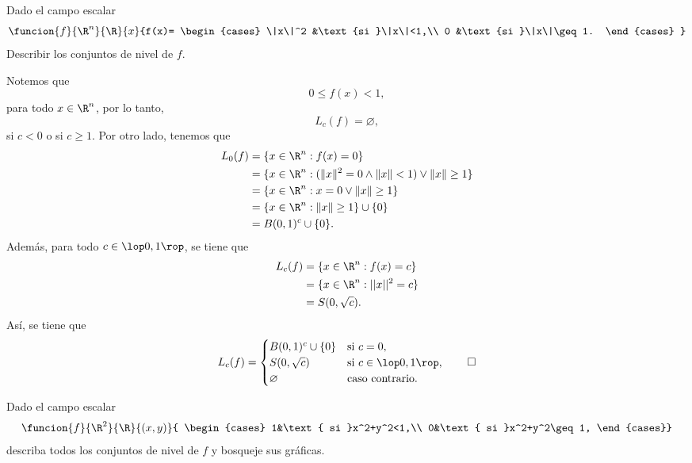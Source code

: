 \documentclass[a4,11pt]{aleph-examen}
\begin{document}
\encabezado

\begin{preguntas}

\item
    Dado el campo escalar
    \[
       \funcion{f}{\R^n}{\R}{x}
       {f(x)=
           \begin{cases}
               \|x\|^2 &\text{si }\|x\|<1,\\
               0 &\text{si }\|x\|\geq 1.
           \end{cases}
       }
    \]
    Describir los conjuntos de nivel de $f$.

\begin{respuesta}
    Notemos que
    \[
        0\leq f(x) < 1,
    \]
    para todo $x\in\R^n$, por lo tanto,
    \[
        L_c(f)=\varnothing,
    \]
    si $c<0$ o si $c\geq 1$. Por otro lado, tenemos que
    \begin{align*}
        L_0(f) 
            &= \{ x\in\R^n: f(x)=0 \}\\
            &= \{ x\in\R^n: (\|x\|^2=0 \land \|x\|<1) \lor \|x\|\geq 1 \}\\
            &= \{ x\in\R^n: x=0 \lor \|x\|\geq 1 \}\\
            &= \{ x\in\R^n: \|x\|\geq 1 \} \cup \{0\}\\
            &= B(0,1)^c\cup\{0\}.
    \end{align*}
    Además, para todo $c\in\lop0,1\rop$, se tiene que
    \begin{align*}
        L_c(f)
            &= \{ x\in\R^n: f(x)=c \}\\
            &= \{ x\in\R^n: ||x||^2=c \}\\
            &= S(0,\sqrt{c}).
    \end{align*}
    Así, se tiene que
    \[
        L_c(f)=
        \begin{cases}
            B(0,1)^c\cup\{0\} &\text{si }c=0,\\
            S(0,\sqrt{c}) &\text{si }c\in\lop0,1\rop,\\
            \varnothing &\text{caso contrario.}
        \end{cases}\qedhere
    \]
\end{respuesta}

\item
    Dado el campo escalar
    \[
        \funcion{f}{\R^2}{\R}{(x,y)}{
         \begin{cases}
            1&\text{ si }x^2+y^2<1,\\
            0&\text{ si }x^2+y^2\geq 1,
         \end{cases}}
    \]
    describa todos los conjuntos de nivel de $f$ y bosqueje sus gráficas.
  

\end{preguntas}
\end{document}
